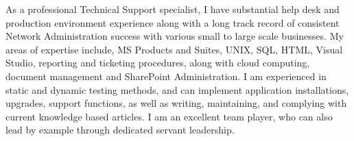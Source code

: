 \begin{cvparagraph}
As a professional Technical Support specialist, I have substantial help desk and production environment experience along with a long track record of consistent Network Administration success with various small to large scale businesses. My areas of expertise include, MS Products and Suites, UNIX, SQL, HTML, Visual Studio, reporting and ticketing procedures, along with cloud computing, document management and SharePoint Administration. I am experienced in static and dynamic testing methods, and can implement application installations, upgrades, support functions, as well as writing, maintaining, and complying with current knowledge based articles. I am an excellent team player, who can also lead by example through dedicated servant leadership.
\end{cvparagraph}